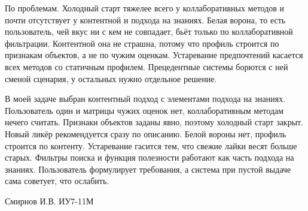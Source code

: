 По проблемам. Холодный старт тяжелее всего у коллаборативных методов и почти отсутствует у контентной и подхода на знаниях. Белая ворона, то есть пользователь, чей вкус ни с кем не совпадает, бьёт только по коллаборативной фильтрации. Контентной она не страшна, потому что профиль строится по признакам объектов, а не по чужим оценкам. Устаревание предпочтений касается всех методов со статичным профилем. Прецедентные системы борются с ней сменой сценария, у остальных нужно отдельное решение.

В моей задаче выбран контентный подход с элементами подхода на знаниях. Пользователь один и матрицы чужих оценок нет, коллаборативным методам нечего считать. Признаки объектов заданы явно, поэтому холодный старт закрыт. Новый ликёр рекомендуется сразу по описанию. Белой вороны нет, профиль строится по контенту. Устаревание гасится тем, что свежие лайки весят больше старых. Фильтры поиска и функция полезности работают как часть подхода на знаниях. Пользователь формулирует требования, а система при пустой выдаче сама советует, что ослабить.

\vspace{1.5em}
\begin{flushright}
Смирнов И.В. ИУ7-11М
\end{flushright}
